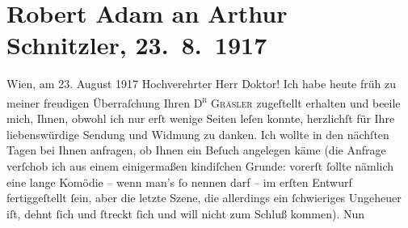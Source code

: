 

         \renewcommand{\erwaehnteOrte}{Orte: Wien}
         \renewcommand{\erwaehnteWerke}{Werke: Das Ende des Judas, Doktor Gräsler, Badearzt, Don Quijote}
               \section[Robert Adam an Arthur Schnitzler, 23. 8. 1917]{ Robert Adam an Arthur Schnitzler, 23. 8. 1917}\nopagebreak{}\rehead{ }\begin{ledgroupsized}[t]{13cm}\normalsize\beginnumbering \toendnotes[C]{\smallbreak\pagebreak[2]} 
\toendnotes[C]{\smallbreak}\pstart
           \raggedleft{}{\pb}Wien, am 23. August 1917\pend
           \pstart{}Hochverehrter Herr Doktor!\pend\pstart
           Ich habe heute früh zu meiner freudigen Überraſchung Ihren \textsc{D\textsuperscript{r}{ }Gräsler} zugeſtellt erhalten und beeile mich, Ihnen, obwohl ich nur erſt wenige
                    Seiten leſen konnte, herzlichſt für Ihre liebenswürdige Sendung und Widmung zu
                    danken.\pend
           \pstart
           Ich wollte in den nächſten Tagen bei Ihnen anfragen, ob Ihnen ein Beſuch
                    angelegen käme (die Anfrage verſchob ich aus einem einigermaßen kindiſchen
                    Grunde: vorerſt ſollte nämlich eine lange Komödie – wenn man’s ſo  nennen darf – im erſten Entwurf fertiggeſtellt ſein, aber die
                    letzte Szene, die allerdings ein ſchwieriges Unge{\pb}heuer iſt, dehnt ſich und ſtreckt ſich und will nicht zum Schluß kommen). Nun

\end{ledgroupsized}
